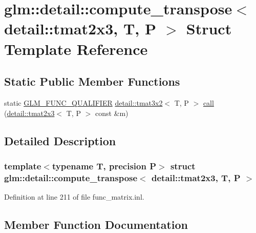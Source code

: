 \hypertarget{structglm_1_1detail_1_1compute__transpose_3_01detail_1_1tmat2x3_00_01_t_00_01_p_01_4}{}\section{glm\+:\+:detail\+:\+:compute\+\_\+transpose$<$ detail\+:\+:tmat2x3, T, P $>$ Struct Template Reference}
\label{structglm_1_1detail_1_1compute__transpose_3_01detail_1_1tmat2x3_00_01_t_00_01_p_01_4}
\subsection*{Static Public Member Functions}
\begin{DoxyCompactItemize}
\item 
static \hyperlink{setup_8hpp_a33fdea6f91c5f834105f7415e2a64407}{G\+L\+M\+\_\+\+F\+U\+N\+C\+\_\+\+Q\+U\+A\+L\+I\+F\+I\+ER} \hyperlink{structglm_1_1detail_1_1tmat3x2}{detail\+::tmat3x2}$<$ T, P $>$ \hyperlink{structglm_1_1detail_1_1compute__transpose_3_01detail_1_1tmat2x3_00_01_t_00_01_p_01_4_a4eb080988185ee66f639a17c9a6f548d}{call} (\hyperlink{structglm_1_1detail_1_1tmat2x3}{detail\+::tmat2x3}$<$ T, P $>$ const \&m)
\end{DoxyCompactItemize}


\subsection{Detailed Description}
\subsubsection*{template$<$typename T, precision P$>$\newline
struct glm\+::detail\+::compute\+\_\+transpose$<$ detail\+::tmat2x3, T, P $>$}



Definition at line 211 of file func\+\_\+matrix.\+inl.



\subsection{Member Function Documentation}
\mbox{\label{structglm_1_1detail_1_1compute__transpose_3_01detail_1_1tmat2x3_00_01_t_00_01_p_01_4_a4eb080988185ee66f639a17c9a6f548d}} 
